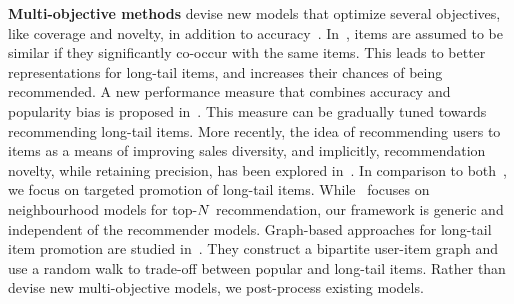 \vspace{2mm}
\noindent \textbf{Multi-objective methods}  devise new models that optimize several objectives, like  coverage and novelty, in addition to accuracy~\cite{vargas2014improving,steck2011item, yin2012challenging,niemann2013new,shi2013trading}.  In~\cite{niemann2013new},  items are assumed to be similar if they significantly co-occur with the same items. This leads to better representations for  long-tail items, and increases their chances of being recommended. A new performance measure that combines accuracy and popularity bias is proposed in~\cite{steck2011item}. This measure can be gradually tuned towards recommending long-tail items.  More recently, the idea of recommending users to items as a means of improving sales diversity, and implicitly, recommendation novelty, while retaining precision, has been explored in~\cite{vargas2014improving}.  In comparison to both~\cite{steck2011item,niemann2013new}, we focus on targeted promotion of long-tail items. While~\cite{vargas2014improving} focuses on neighbourhood models for top-$N$ recommendation, our framework is generic and independent of the recommender models. 
Graph-based approaches for long-tail item promotion are studied in~\cite{yin2012challenging,shi2013trading}. They  construct a bipartite user-item graph and use a random walk to trade-off between popular and long-tail items. Rather than devise new  multi-objective models, we post-process existing models.


